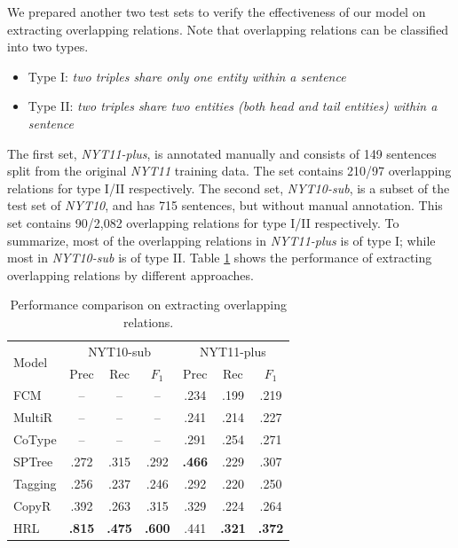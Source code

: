 \documentclass[letterpaper]{article} %
\theoremstyle{definition}
\begin{document}
We prepared another two test sets to verify the effectiveness of our model on extracting overlapping relations. Note that overlapping relations can be classified into two types.
\begin{itemize}
    \item Type I: {\it two triples share only one entity within a sentence}
    \item Type II: {\it two triples share two entities (both head and tail entities) within a sentence}
\end{itemize}
The first set,
\textit{NYT11-plus}, is annotated manually and consists of 149 sentences split from the original \textit{NYT11} training data. The set contains 210/97 overlapping relations for type I/II respectively.
The second set,
\textit{NYT10-sub}, is a subset of the test set of \textit{NYT10}, and has 715 sentences, but without manual annotation. This set contains 90/2,082 overlapping relations for type I/II respectively. To summarize, most of the overlapping relations in \textit{NYT11-plus} is of type I; while most in \textit{NYT10-sub} is of type II.
Table \ref{overlapping} shows the performance of extracting overlapping relations by different approaches.

\begin{table}[!htb]
    \centering
    \begin{tabular}{lcccccc}
    \toprule
        \multirow{2}{*}{Model} & \multicolumn{3}{c}{NYT10-sub} & \multicolumn{3}{c}{NYT11-plus}  \\
        & Prec & Rec & $F_1$ & Prec & Rec & $F_1$ \\
    \midrule
        FCM    & -- & -- & -- & .234 & .199 & .219 \\
        MultiR & -- & -- & -- & .241 & .214 & .227 \\
        CoType & -- & -- & -- & .291 & .254 & .271 \\
        SPTree & .272 & .315 & .292 & \textbf{.466} & .229 & .307 \\
        Tagging & .256 & .237 & .246 & .292 & .220 & .250 \\
        CopyR & .392 & .263 & .315 & .329 & .224 & .264 \\
    \midrule
        HRL    & \textbf{.815} & \textbf{.475} & \textbf{.600} & .441 & \textbf{.321} & \textbf{.372} \\
    \bottomrule
    \end{tabular}
    \caption{Performance comparison on extracting overlapping relations.}
    \label{overlapping}
\end{table} %
\end{document}
